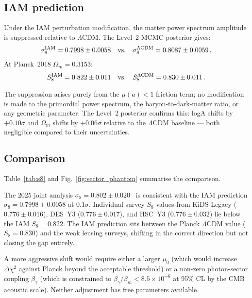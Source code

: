 \documentclass[12pt,a4paper]{article}
\newcommand{\lcdm}{$\Lambda$CDM}
\newcommand{\lcdmmath}{\Lambda\mathrm{CDM}}  %
\newcommand{\Dchi}{\Delta\chi^2}
\begin{document}
\subsection{IAM prediction}
\label{sec:lensing_pred}

Under the IAM perturbation modification, the matter power spectrum
amplitude is suppressed relative to \lcdm{}.
The Level~2 MCMC posterior gives:
\begin{equation}
\sigma_8^{\rm IAM} = 0.7998 \pm 0.0058
\quad \text{vs.} \quad
\sigma_8^{\lcdmmath} = 0.8087 \pm 0.0059 \,.
\end{equation}
At Planck~2018 $\Omega_m = 0.3153$:
\begin{equation}
S_8^{\rm IAM} = 0.822 \pm 0.011
\quad \text{vs.} \quad
S_8^{\lcdmmath} = 0.830 \pm 0.011 \,.
\end{equation}

The suppression arises purely from the $\mu(a) < 1$ friction term;
no modification is made to the primordial power spectrum, the
baryon-to-dark-matter ratio, or any geometric parameter.
The Level~2 posterior confirms this: logA shifts by $+0.10\sigma$ and
$\Omega_m$ shifts by $+0.06\sigma$ relative to the \lcdm{} baseline
--- both negligible compared to their uncertainties.

\subsection{Comparison}
\label{sec:lensing_compare}

Table~\ref{tab:s8} and Fig.~\ref{fig:sector_phantom} summarise the comparison.

The 2025 joint analysis $\sigma_8 = 0.802 \pm 0.020$~\citep{Stolzner2025kids}
is consistent with the IAM prediction $\sigma_8 = 0.7998 \pm 0.0058$ at
$0.1\sigma$.
Individual survey $S_8$ values from KiDS-Legacy ($0.776 \pm 0.016$),
DES~Y3 ($0.776 \pm 0.017$), and HSC~Y3 ($0.776 \pm 0.032$) lie
below the IAM $S_8 = 0.822$.
The IAM prediction sits between the Planck \lcdm{} value ($S_8 = 0.830$)
and the weak lensing surveys, shifting in the correct direction but not
closing the gap entirely.

A more aggressive shift would require either a larger $\mu_0$ (which
would increase $\Dchi$ against Planck beyond the acceptable threshold)
or a non-zero photon-sector coupling $\beta_\gamma$ (which is constrained
to $\beta_\gamma/\beta_m < 8.5 \times 10^{-6}$ at 95\% CL by the CMB
acoustic scale).
Neither adjustment has free parameters available.
\end{document}
